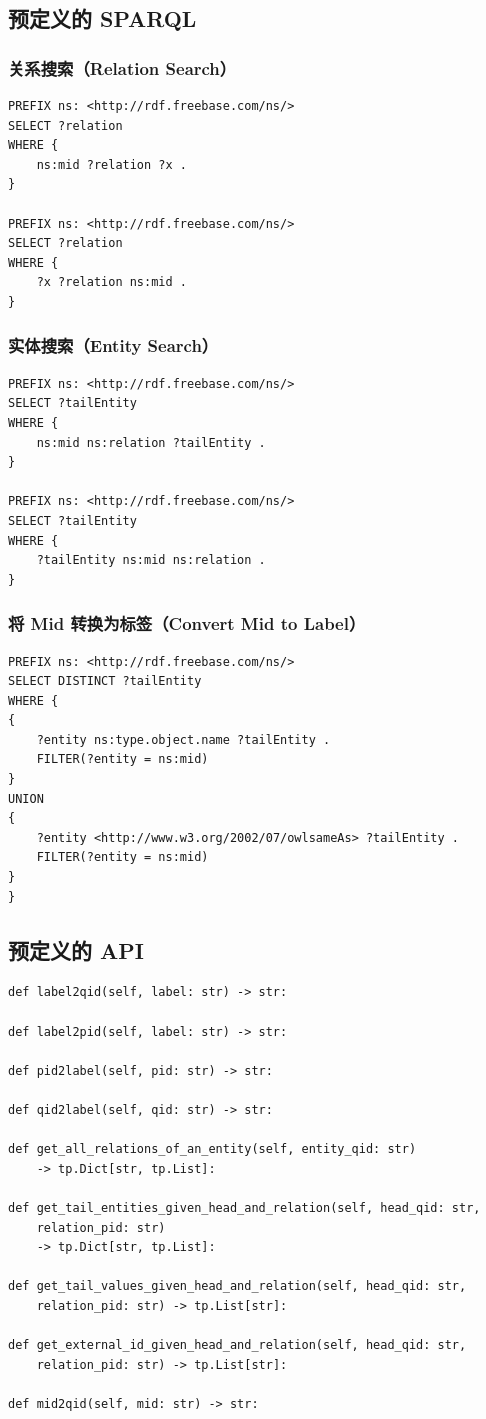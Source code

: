 \documentclass[11pt,UTF8,fontset=fandol]{ctexart}
\begin{document}
\subsection{预定义的 SPARQL}

\subsubsection{关系搜索（Relation Search）}
\begin{verbatim}
PREFIX ns: <http://rdf.freebase.com/ns/>
SELECT ?relation
WHERE {
    ns:mid ?relation ?x .
}

PREFIX ns: <http://rdf.freebase.com/ns/>
SELECT ?relation
WHERE {
    ?x ?relation ns:mid .
}
\end{verbatim}

\subsubsection{实体搜索（Entity Search）}
\begin{verbatim}
PREFIX ns: <http://rdf.freebase.com/ns/>
SELECT ?tailEntity
WHERE {
    ns:mid ns:relation ?tailEntity .
}

PREFIX ns: <http://rdf.freebase.com/ns/>
SELECT ?tailEntity
WHERE {
    ?tailEntity ns:mid ns:relation .
}
\end{verbatim}

\subsubsection{将 Mid 转换为标签（Convert Mid to Label）}
\begin{verbatim}
PREFIX ns: <http://rdf.freebase.com/ns/>
SELECT DISTINCT ?tailEntity
WHERE {
{
    ?entity ns:type.object.name ?tailEntity .
    FILTER(?entity = ns:mid)
}
UNION
{
    ?entity <http://www.w3.org/2002/07/owlsameAs> ?tailEntity .
    FILTER(?entity = ns:mid)
}
}
\end{verbatim}

\subsection{预定义的 API}
\begin{verbatim}
def label2qid(self, label: str) -> str:

def label2pid(self, label: str) -> str:

def pid2label(self, pid: str) -> str:

def qid2label(self, qid: str) -> str:

def get_all_relations_of_an_entity(self, entity_qid: str)
    -> tp.Dict[str, tp.List]:

def get_tail_entities_given_head_and_relation(self, head_qid: str,
    relation_pid: str)
    -> tp.Dict[str, tp.List]:

def get_tail_values_given_head_and_relation(self, head_qid: str,
    relation_pid: str) -> tp.List[str]:

def get_external_id_given_head_and_relation(self, head_qid: str,
    relation_pid: str) -> tp.List[str]:

def mid2qid(self, mid: str) -> str:
\end{verbatim}
\end{document}
